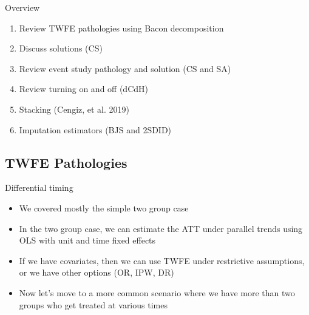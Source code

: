 \documentclass{beamer}
\begin{document}






\begin{frame}{Overview}

\begin{enumerate}
\item Review TWFE pathologies using Bacon decomposition
\item Discuss solutions (CS)
\item Review event study pathology and solution (CS and SA)
\item Review turning on and off (dCdH)
\item Stacking (Cengiz, et al. 2019)
\item Imputation estimators (BJS and 2SDID)
\end{enumerate}

\end{frame}



\subsection{TWFE Pathologies}






\begin{frame}{Differential timing}

\begin{itemize}
\item We covered mostly the simple two group case
\item In the two group case, we can estimate the ATT under parallel trends using OLS with unit and time fixed effects
\item If we have covariates, then we can use TWFE under restrictive assumptions, or we have other options (OR, IPW, DR)
\item Now let's move to a more common scenario where we have more than two groups who get treated at various times
\end{itemize}

\end{frame}
\end{document}
